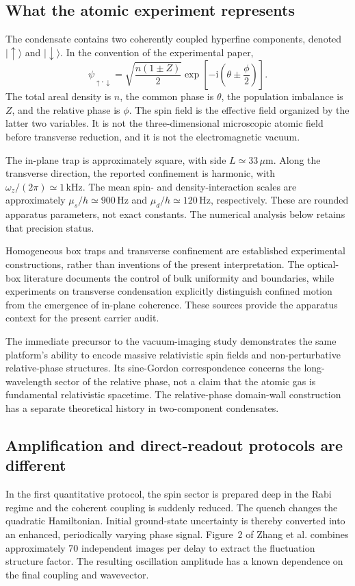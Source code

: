 \documentclass[11pt,a4paper]{article}
\theoremstyle{definition}
\theoremstyle{remark}
\newcommand{\ii}{\mathrm{i}}
\begin{document}
\subsection{What the atomic experiment represents}
The condensate contains two coherently coupled hyperfine components, denoted $\lvert\uparrow\rangle$ and $\lvert\downarrow\rangle$. In the convention of the experimental paper,
\begin{equation}
 \psi_{\uparrow,\downarrow}
 =\sqrt{\frac{n(1\pm Z)}{2}}
   \exp\!\left[-\ii\left(\theta\pm\frac{\phi}{2}\right)\right].
 \label{eq:spinor}
\end{equation}
The total areal density is $n$, the common phase is $\theta$, the population imbalance is $Z$, and the relative phase is $\phi$. The spin field is the effective field organized by the latter two variables. It is not the three-dimensional microscopic atomic field before transverse reduction, and it is not the electromagnetic vacuum.\cite{zhang2026}

The in-plane trap is approximately square, with side $L\simeq33\,\mu\mathrm m$. Along the transverse direction, the reported confinement is harmonic, with $\omega_z/(2\pi)\simeq1\,\mathrm{kHz}$. The mean spin- and density-interaction scales are approximately $\mu_s/h\simeq900\,\mathrm{Hz}$ and $\mu_d/h\simeq120\,\mathrm{Hz}$, respectively. These are rounded apparatus parameters, not exact constants. The numerical analysis below retains that precision status.\cite{zhang2026}

Homogeneous box traps and transverse confinement are established experimental constructions, rather than inventions of the present interpretation. The optical-box literature documents the control of bulk uniformity and boundaries, while experiments on transverse condensation explicitly distinguish confined motion from the emergence of in-plane coherence. These sources provide the apparatus context for the present carrier audit.\cite{navon,chomaz}

The immediate precursor to the vacuum-imaging study demonstrates the same platform's ability to encode massive relativistic spin fields and non-perturbative relative-phase structures. Its sine-Gordon correspondence concerns the long-wavelength sector of the relative phase, not a claim that the atomic gas is fundamental relativistic spacetime. The relative-phase domain-wall construction has a separate theoretical history in two-component condensates.\cite{precursor,son}

\subsection{Amplification and direct-readout protocols are different}
In the first quantitative protocol, the spin sector is prepared deep in the Rabi regime and the coherent coupling is suddenly reduced. The quench changes the quadratic Hamiltonian. Initial ground-state uncertainty is thereby converted into an enhanced, periodically varying phase signal. Figure~2 of Zhang et al. combines approximately 70 independent images per delay to extract the fluctuation structure factor. The resulting oscillation amplitude has a known dependence on the final coupling and wavevector.\cite{zhang2026}
\end{document}

